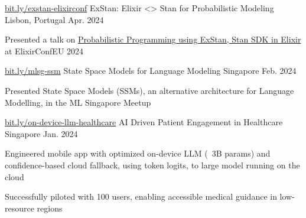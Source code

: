


\begin{cventries}


  \cventry
    {\href{https://bit.ly/exstan-elixirconf}{bit.ly/exstan-elixirconf}}
    {ExStan: Elixir <> Stan for Probabilistic Modeling} %
    {Lisbon, Portugal} %
    {Apr. 2024} %
    {
      \begin{cvitems} %
        \item {Presented a talk on \href{https://github.com/goodhamgupta/ex_stan}{Probabilistic Programming using ExStan, Stan SDK in Elixir} at ElixirConfEU 2024 }
      \end{cvitems}
    }

  \cventry
    {\href{https://bit.ly/mlsg-ssm}{bit.ly/mlsg-ssm}}
    {State Space Models for Language Modeling} %
    {Singapore} %
    {Feb. 2024} %
    {
      \begin{cvitems} %
        \item {Presented State Space Models (SSMs), an alternative architecture for Language Modelling, in the ML Singapore Meetup }
      \end{cvitems}
    }

  \cventry
    {\href{https://bit.ly/on-device-llm-healthcare}{bit.ly/on-device-llm-healthcare}}
    {AI Driven Patient Engagement in Healthcare} %
    {Singapore} %
    {Jan. 2024} %
    {
      \begin{cvitems} %
        \item {Engineered mobile app with optimized on-device LLM (~3B params) and confidence-based cloud fallback, using token logits, to large model running on the cloud}
        \item {Successfully piloted with 100 users, enabling accessible medical guidance in low-resource regions}
      \end{cvitems}
    }



\end{cventries}

